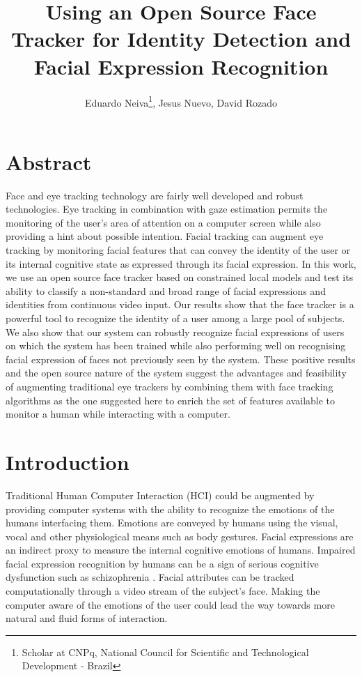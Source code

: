 \documentclass[]{article}
\title{Using an Open Source Face Tracker for Identity Detection and Facial
Expression Recognition}
\author{Eduardo Neiva\footnote{Scholar at CNPq, National
Council for Scientific and Technological Development - Brazil}, Jesus Nuevo, David Rozado}
\begin{document}
\maketitle

\section{Abstract}

Face and eye tracking technology are fairly well developed and robust technologies. Eye tracking in combination with
gaze estimation permits the monitoring of the user's area of attention on a computer screen while also providing a hint
about possible intention. Facial tracking can augment eye tracking by monitoring facial features that can convey the
identity of the user or its internal cognitive state as expressed through its facial expression. In this work, we use an
open source face tracker based on constrained local models and test its ability to classify a non-standard and broad
range of facial expressions and identities from continuous video input. Our results show that the face tracker is a
powerful tool to recognize the identity of a user among a large pool of subjects. We also show that our system can
robustly recognize facial expressions of users on which the system has been trained while also performing well on
recognising facial expression of faces not previously seen by the system. These positive results and the open source
nature of the system suggest the advantages and feasibility of augmenting traditional eye trackers by combining them
with face tracking algorithms as the one suggested here to enrich the set of features available to monitor a human while
interacting with a computer.


\section{Introduction}
Traditional Human Computer Interaction (HCI) could be augmented by providing computer systems with the ability to
recognize the emotions of the humans interfacing them. Emotions are conveyed by humans using the visual, vocal
and other physiological means such as body gestures. Facial expressions are an indirect proxy to measure the internal
cognitive emotions of humans. Impaired facial expression recognition by humans can be a sign of serious cognitive
dysfunction such as schizophrenia \cite{Edwards2002789}.  Facial attributes can be tracked computationally through a
video stream of the subject's face. Making the computer aware of the emotions of the user could lead the way towards
more natural and fluid forms of interaction.
\end{document}

